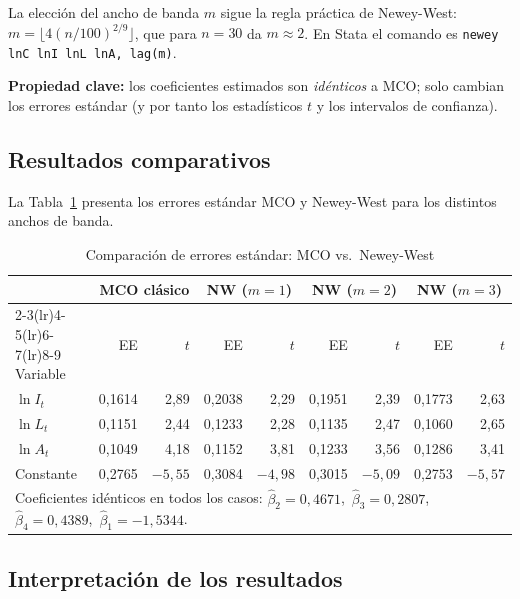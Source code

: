 \documentclass[12pt,a4paper]{article}
\begin{document}
La elección del ancho de banda $m$ sigue la regla práctica de Newey-West:
$m = \lfloor 4(n/100)^{2/9} \rfloor$, que para $n=30$ da $m \approx 2$.
En Stata el comando es \texttt{newey lnC lnI lnL lnA, lag(m)}.

\textbf{Propiedad clave:} los coeficientes estimados son \emph{idénticos} a
MCO; solo cambian los errores estándar (y por tanto los estadísticos $t$
y los intervalos de confianza).

\subsection{Resultados comparativos}

La Tabla~\ref{tab:nw} presenta los errores estándar MCO y Newey-West para
los distintos anchos de banda.

\begin{table}[H]
  \centering
  \caption{Comparación de errores estándar: MCO vs.\ Newey-West}
  \label{tab:nw}
  \small
  \begin{tabular}{l rr rr rr rr}
    \toprule
    & \multicolumn{2}{c}{MCO clásico}
    & \multicolumn{2}{c}{NW ($m=1$)}
    & \multicolumn{2}{c}{NW ($m=2$)}
    & \multicolumn{2}{c}{NW ($m=3$)} \\
    \cmidrule(lr){2-3}\cmidrule(lr){4-5}\cmidrule(lr){6-7}\cmidrule(lr){8-9}
    Variable & EE & $t$ & EE & $t$ & EE & $t$ & EE & $t$ \\
    \midrule
    $\ln I_t$   & 0{,}1614 & 2{,}89 & 0{,}2038 & 2{,}29 & 0{,}1951 & 2{,}39 & 0{,}1773 & 2{,}63 \\
    $\ln L_t$   & 0{,}1151 & 2{,}44 & 0{,}1233 & 2{,}28 & 0{,}1135 & 2{,}47 & 0{,}1060 & 2{,}65 \\
    $\ln A_t$   & 0{,}1049 & 4{,}18 & 0{,}1152 & 3{,}81 & 0{,}1233 & 3{,}56 & 0{,}1286 & 3{,}41 \\
    Constante   & 0{,}2765 & $-5{,}55$ & 0{,}3084 & $-4{,}98$ & 0{,}3015 & $-5{,}09$ & 0{,}2753 & $-5{,}57$ \\
    \bottomrule
    \multicolumn{9}{l}{\small Coeficientes idénticos en todos los casos:
      $\hat\beta_2=0{,}4671$,\ $\hat\beta_3=0{,}2807$,\ $\hat\beta_4=0{,}4389$,\
      $\hat\beta_1=-1{,}5344$.}
  \end{tabular}
\end{table}

\subsection{Interpretación de los resultados}
\end{document}
